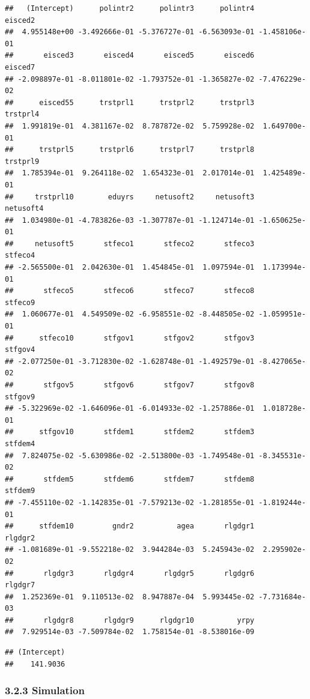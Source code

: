 \documentclass[
]{article}
\begin{document}
\begin{verbatim}
##   (Intercept)      polintr2      polintr3      polintr4       eisced2 
##  4.955148e+00 -3.492666e-01 -5.376727e-01 -6.563093e-01 -1.458106e-01 
##       eisced3       eisced4       eisced5       eisced6       eisced7 
## -2.098897e-01 -8.011801e-02 -1.793752e-01 -1.365827e-02 -7.476229e-02 
##      eisced55      trstprl1      trstprl2      trstprl3      trstprl4 
##  1.991819e-01  4.381167e-02  8.787872e-02  5.759928e-02  1.649700e-01 
##      trstprl5      trstprl6      trstprl7      trstprl8      trstprl9 
##  1.785394e-01  9.264118e-02  1.654323e-01  2.017014e-01  1.425489e-01 
##     trstprl10        eduyrs     netusoft2     netusoft3     netusoft4 
##  1.034980e-01 -4.783826e-03 -1.307787e-01 -1.124714e-01 -1.650625e-01 
##     netusoft5       stfeco1       stfeco2       stfeco3       stfeco4 
## -2.565500e-01  2.042630e-01  1.454845e-01  1.097594e-01  1.173994e-01 
##       stfeco5       stfeco6       stfeco7       stfeco8       stfeco9 
##  1.060677e-01  4.549509e-02 -6.958551e-02 -8.448505e-02 -1.059951e-01 
##      stfeco10       stfgov1       stfgov2       stfgov3       stfgov4 
## -2.077250e-01 -3.712830e-02 -1.628748e-01 -1.492579e-01 -8.427065e-02 
##       stfgov5       stfgov6       stfgov7       stfgov8       stfgov9 
## -5.322969e-02 -1.646096e-01 -6.014933e-02 -1.257886e-01  1.018728e-01 
##      stfgov10       stfdem1       stfdem2       stfdem3       stfdem4 
##  7.824075e-02 -5.630986e-02 -2.513800e-03 -1.749548e-01 -8.345531e-02 
##       stfdem5       stfdem6       stfdem7       stfdem8       stfdem9 
## -7.455110e-02 -1.142835e-01 -7.579213e-02 -1.281855e-01 -1.819244e-01 
##      stfdem10         gndr2          agea       rlgdgr1       rlgdgr2 
## -1.081689e-01 -9.552218e-02  3.944284e-03  5.245943e-02  2.295902e-02 
##       rlgdgr3       rlgdgr4       rlgdgr5       rlgdgr6       rlgdgr7 
##  1.252369e-01  9.110513e-02  8.947887e-04  5.993445e-02 -7.731684e-03 
##       rlgdgr8       rlgdgr9      rlgdgr10          yrpy 
##  7.929514e-03 -7.509784e-02  1.758154e-01 -8.538016e-09
\end{verbatim}

\begin{verbatim}
## (Intercept) 
##    141.9036
\end{verbatim}

\hypertarget{simulation}{%
\subsubsection{3.2.3 Simulation}\label{simulation}}
\end{document}
